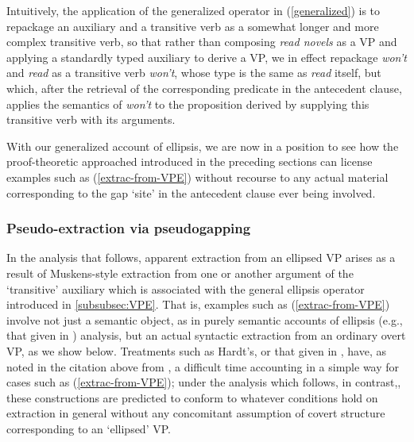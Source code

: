 \documentclass[output=paper,colorlinks,citecolor=brown]{langscibook}
\begin{document}
\noindent Intuitively, the application of the generalized operator in
(\ref{generalized}) is to repackage an auxiliary and a transitive verb as a
somewhat longer and more complex transitive verb, so that rather than
composing \textit{read novels} as a VP and applying a standardly typed
auxiliary to derive a VP, we in effect repackage \textit{won't} and \textit{read} as
a transitive verb \textit{won't}, whose type is the same as \textit{read} itself,
but which, after the retrieval of the corresponding predicate in the
antecedent clause, applies the semantics of \textit{won't} to the proposition
derived by supplying this transitive verb with its arguments.

With our generalized account of ellipsis, we are now in a position to
see how the proof-theoretic approached introduced in the preceding
sections can license examples such as (\ref{extrac-from-VPE}) without
recourse to any actual material corresponding to the gap `site' in the
antecedent clause ever being involved.  

\subsubsection{Pseudo-extraction via pseudogapping}\label{subsubsec:pseudoextrac}

In the analysis that follows, apparent extraction from an ellipsed VP
arises as a result of Muskens-style extraction from one or another
argument of the `transitive' auxiliary which is associated with the
general ellipsis operator introduced in
\textsection\ref{subsubsec:VPE}. That is, examples such as
(\ref{extrac-from-VPE}) involve not just a semantic object, as in purely
semantic accounts of ellipsis (e.g., that given in \citealt{hardt-diss})
analysis, but an actual syntactic extraction from an ordinary overt
VP, as we show below. Treatments such as Hardt's, or that given in
\citet{dalrymple-etal1991}, have, as noted in the citation above from
\citet{Elbourne2008}, a difficult time accounting in a simple way for cases
such as (\ref{extrac-from-VPE}); under the analysis which follows, in
contrast,, these constructions are predicted to conform to whatever
conditions hold on extraction in general without any concomitant
assumption of covert structure corresponding to an `ellipsed' VP.
\end{document}
